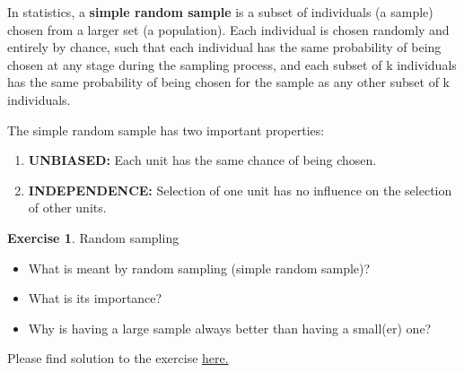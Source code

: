 \documentclass[
  12pt,
  oneside]{book}
\providecommand{\tightlist}{%
  \setlength{\itemsep}{0pt}\setlength{\parskip}{0pt}}
\theoremstyle{definition}
\theoremstyle{definition}
\theoremstyle{definition}
\newtheorem{exercise}{Exercise}[chapter]
\theoremstyle{definition}
\theoremstyle{remark}
\begin{document}
In statistics, a \textbf{simple random sample} is a subset of individuals (a sample) chosen from a larger set (a population). Each individual is chosen randomly and entirely by chance, such that each individual has the same probability of being chosen at any stage during the sampling process, and each subset of k individuals has the same probability of being chosen for the sample as any other subset of k individuals.

The simple random sample has two important properties:

\begin{enumerate}
\def\labelenumi{\arabic{enumi}.}
\tightlist
\item
  \textbf{UNBIASED:} Each unit has the same chance of being chosen.
\item
  \textbf{INDEPENDENCE:} Selection of one unit has no influence on the selection of other units.
\end{enumerate}

\begin{exercise}
\protect\hypertarget{exr:randomsampling}{}\label{exr:randomsampling}Random sampling

\begin{itemize}
\tightlist
\item
  What is meant by random sampling (simple random sample)?
\item
  What is its importance?
\item
  Why is having a large sample always better than having a small(er) one?
\end{itemize}

Please find solution to the exercise \protect\hyperlink{sol:randomsampling}{here.}
\end{exercise}
\end{document}

